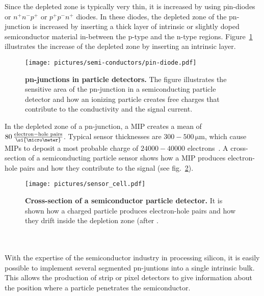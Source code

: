 Since the depleted zone is typically very thin, it is increased by using pin-diodes or $n^+n^-p^+$ or $p^+p^-n^+$ diodes. In these diodes, the depleted zone of the pn-junction is increased by inserting a thick layer of intrinsic or slightly doped semiconductor material in-between the p-type and the n-type regions. Figure~\ref{fig:pin-diode} illustrates the increase of the depleted zone by inserting an intrinsic layer.
\begin{figure}
\begin{center}
\texttt{[image: pictures/semi-conductors/pin-diode.pdf]}
\end{center}
\caption[pn-junctions in particle detectors]{\textbf{pn-junctions in particle detectors.} The figure illustrates the sensitive area of the pn-junction in a semiconducting particle detector and how an ionizing particle creates free charges that contribute to the conductivity and the signal current.}\label{fig:pin-diode}
\end{figure}
In the depleted zone of a pn-junction, a \acs{MIP} creates a mean of $80\,\frac{\rm{electron-hole\,\, pairs}}{\si{\micro \meter}}$. Typical sensor thicknesses are $300-500\,\si{\micro \meter}$, which cause \acs{MIP}s to deposit a most probable charge of $24000-40000$ electrons~\cite{Tin11}. A cross-section of a semiconducting particle sensor shows how a \acs{MIP} produces electron-hole pairs and how they contribute to the signal (see fig.~\ref{fig:sensor_cell}).
\begin{figure}
\begin{center}
\texttt{[image: pictures/sensor\_cell.pdf]}
\end{center}
\caption[Cross-section of a semiconductor particle detector]{\textbf{Cross-section of a semiconductor particle detector.} It is shown how a charged particle produces electron-hole pairs and how they drift inside the depletion zone (after \cite{Ros06}.}\label{fig:sensor_cell}
\end{figure} 
\\
\\With the expertise of the semiconductor industry in processing silicon, it is easily possible to implement several segmented pn-juntions into a single intrinsic bulk. This allows the production of strip or pixel detectors to give information about the position where a particle penetrates the semiconductor.